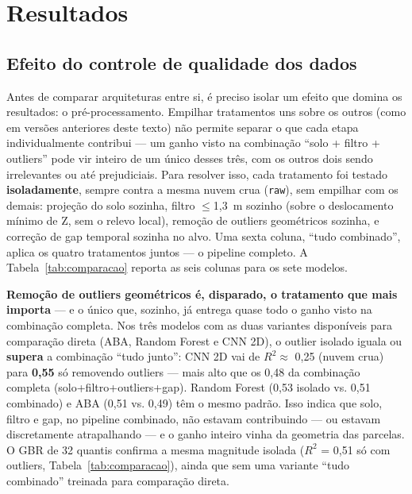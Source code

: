 \section{Resultados}
\label{sec:resultados}

\subsection{Efeito do controle de qualidade dos dados}
\label{sec:preproc}

Antes de comparar arquiteturas entre si, é preciso isolar um efeito que domina os
resultados: o pré-processamento. Empilhar tratamentos uns sobre os outros (como em
versões anteriores deste texto) não permite separar o que cada etapa
individualmente contribui --- um ganho visto na combinação ``solo + filtro +
outliers'' pode vir inteiro de um único desses três, com os outros dois sendo
irrelevantes ou até prejudiciais. Para resolver isso, cada tratamento foi testado
\textbf{isoladamente}, sempre contra a mesma nuvem crua (\texttt{raw}), sem
empilhar com os demais: projeção do solo sozinha, filtro $\leq$1,3~m sozinho
(sobre o deslocamento mínimo de Z, sem o relevo local), remoção de outliers
geométricos sozinha, e correção de gap temporal sozinha no alvo. Uma sexta
coluna, ``tudo combinado'', aplica os quatro tratamentos juntos --- o pipeline
completo. A Tabela~\ref{tab:comparacao} reporta as seis colunas para os sete
modelos.

\textbf{Remoção de outliers geométricos é, disparado, o tratamento que mais
importa} --- e o único que, sozinho, já entrega quase todo o ganho visto na
combinação completa. Nos três modelos com as duas variantes disponíveis para
comparação direta (ABA, Random Forest e CNN 2D), o outlier isolado iguala ou
\textbf{supera} a combinação ``tudo junto'': CNN 2D vai de $R^2 \approx$ 0,25
(nuvem crua) para \textbf{0,55} só removendo outliers --- mais alto que os 0,48 da
combinação completa (solo+filtro+outliers+gap). Random Forest (0,53 isolado vs.
0,51 combinado) e ABA (0,51 vs. 0,49) têm o mesmo padrão. Isso indica que solo,
filtro e gap, no pipeline combinado, não estavam contribuindo --- ou estavam
discretamente atrapalhando --- e o ganho inteiro vinha da geometria das parcelas.
O GBR de 32 quantis confirma a mesma magnitude isolada ($R^2$ = 0,51 só com
outliers, Tabela~\ref{tab:comparacao}), ainda que sem uma variante ``tudo
combinado'' treinada para comparação direta.

